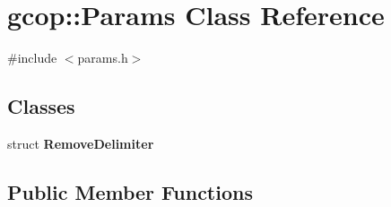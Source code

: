 \section{gcop\-:\-:\-Params \-Class \-Reference}
\label{classgcop_1_1Params}


{\ttfamily \#include $<$params.\-h$>$}

\subsection*{\-Classes}
\begin{DoxyCompactItemize}
\item 
struct {\bf \-Remove\-Delimiter}
\end{DoxyCompactItemize}
\subsection*{\-Public \-Member \-Functions}

